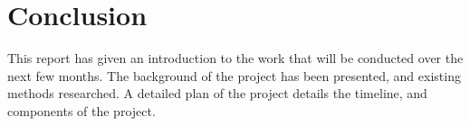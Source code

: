 \documentclass{article}
\begin{document}
\section{Conclusion}


This report has given an introduction to the work that will be conducted over the next few months.
The background of the project has been presented, and existing methods researched.
A detailed plan of the project details the timeline, and components of the project.

\printbibliography
\end{document}

